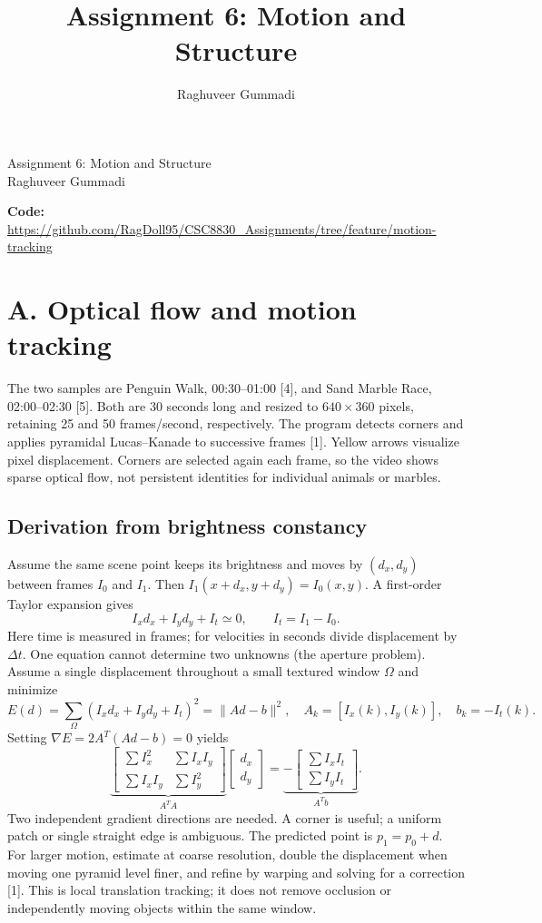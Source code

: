 \documentclass[10pt,letterpaper]{article}
\title{Assignment 6: Motion and Structure}
\author{Raghuveer Gummadi}
\date{}
\begin{document}
\begin{center}\Large Assignment 6: Motion and Structure\\[4pt]\normalsize Raghuveer Gummadi\end{center}
\textbf{Code:} \url{https://github.com/RagDoll95/CSC8830_Assignments/tree/feature/motion-tracking}

\section*{A. Optical flow and motion tracking}
The two samples are Penguin Walk, 00:30--01:00 [4], and Sand Marble Race,
02:00--02:30 [5]. Both are 30 seconds long and resized to $640\times360$ pixels,
retaining 25 and 50 frames/second, respectively. The program detects corners and
applies pyramidal Lucas--Kanade to successive frames [1]. Yellow arrows visualize
pixel displacement. Corners are selected again each frame, so the video shows sparse
optical flow, not persistent identities for individual animals or marbles.

\subsection*{Derivation from brightness constancy}
Assume the same scene point keeps its brightness and moves by $(d_x,d_y)$ between
frames $I_0$ and $I_1$. Then $I_1(x+d_x,y+d_y)=I_0(x,y)$. A first-order Taylor
expansion gives
\[
 I_xd_x+I_yd_y+I_t\simeq0,\qquad I_t=I_1-I_0.
\]
Here time is measured in frames; for velocities in seconds divide displacement by
$\Delta t$. One equation cannot determine two unknowns (the aperture problem).
Assume a single displacement throughout a small textured window $\Omega$ and minimize
\[
 E(d)=\sum_{\Omega}(I_xd_x+I_yd_y+I_t)^2=\|Ad-b\|^2,
 \quad A_k=[I_x(k),I_y(k)],\quad b_k=-I_t(k).
\]
Setting $\nabla E=2A^T(Ad-b)=0$ yields
\[
\underbrace{\begin{bmatrix}\sum I_x^2&\sum I_xI_y\\\sum I_xI_y&\sum I_y^2\end{bmatrix}}_{A^TA}
\begin{bmatrix}d_x\\d_y\end{bmatrix}
=\underbrace{-\begin{bmatrix}\sum I_xI_t\\\sum I_yI_t\end{bmatrix}}_{A^Tb}.
\]
Two independent gradient directions are needed. A corner is useful; a uniform patch
or single straight edge is ambiguous. The predicted point is $p_1=p_0+d$.
For larger motion, estimate at coarse resolution, double the displacement when moving
one pyramid level finer, and refine by warping and solving for a correction [1].
This is local translation tracking; it does not remove occlusion or independently
moving objects within the same window.
\end{document}
